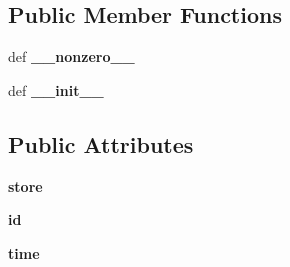 \subsection*{Public Member Functions}
\begin{DoxyCompactItemize}
\item 
\hypertarget{classcheshire3_1_1base_store_1_1_deleted_object_a7da6aa66b33e8ce446bd03e0c4b0da29}{def {\bfseries \-\_\-\-\_\-nonzero\-\_\-\-\_\-}}\label{classcheshire3_1_1base_store_1_1_deleted_object_a7da6aa66b33e8ce446bd03e0c4b0da29}

\item 
\hypertarget{classcheshire3_1_1base_store_1_1_deleted_object_a3de1068dc8e631e195ee978b9da0945b}{def {\bfseries \-\_\-\-\_\-init\-\_\-\-\_\-}}\label{classcheshire3_1_1base_store_1_1_deleted_object_a3de1068dc8e631e195ee978b9da0945b}

\end{DoxyCompactItemize}
\subsection*{Public Attributes}
\begin{DoxyCompactItemize}
\item 
\hypertarget{classcheshire3_1_1base_store_1_1_deleted_object_a73ea2b70e15e97ac5c284f681c856985}{{\bfseries store}}\label{classcheshire3_1_1base_store_1_1_deleted_object_a73ea2b70e15e97ac5c284f681c856985}

\item 
\hypertarget{classcheshire3_1_1base_store_1_1_deleted_object_a7208d85f9855586eb7ab614cc2ae561d}{{\bfseries id}}\label{classcheshire3_1_1base_store_1_1_deleted_object_a7208d85f9855586eb7ab614cc2ae561d}

\item 
\hypertarget{classcheshire3_1_1base_store_1_1_deleted_object_ab034395797c6b93fc782e65de7ee0d16}{{\bfseries time}}\label{classcheshire3_1_1base_store_1_1_deleted_object_ab034395797c6b93fc782e65de7ee0d16}

\end{DoxyCompactItemize}
